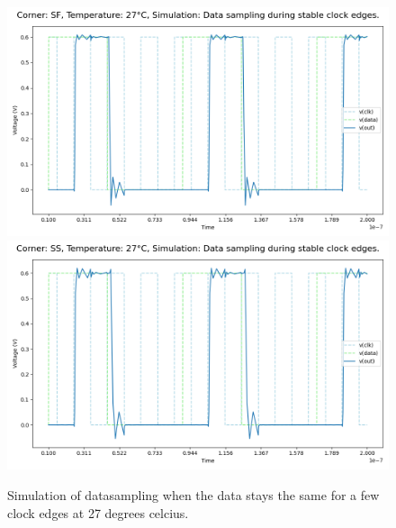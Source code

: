 \begin{figure}[H]
    \vspace{5pt}
    \includegraphics[height= 0.21\textheight]{figures/aimspice/0.600_0.1u_0.1u_0.3u_0.1u/functionality/SF27W2.png}
    \vspace{5pt}
    \includegraphics[height= 0.21\textheight]{figures/aimspice/0.600_0.1u_0.1u_0.3u_0.1u/functionality/SS27W2.png}
    \caption{Simulation of datasampling when the data stays the same for a few clock edges at 27 degrees celcius.}
    \label{fig:aimspice_W2_27}
\end{figure}

\pagebreak

